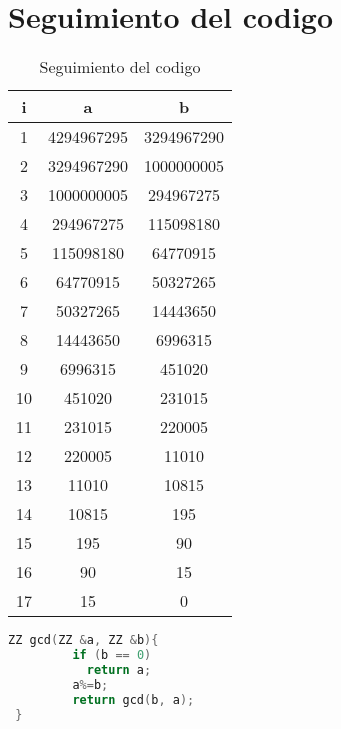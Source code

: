 \section{Seguimiento del codigo}
\begin{table}[!h]
\label{tablax}
\begin{center}
\begin{tabular}{|c|c|c|}
\hline 
i&a&b \\
\hline
1&4294967295&3294967290\\\hline
2&3294967290&1000000005\\\hline
3&1000000005&294967275\\\hline
4&294967275&115098180\\\hline
5&115098180&64770915\\\hline
6&64770915&50327265\\\hline
7&50327265&14443650\\\hline
8&14443650&6996315\\\hline
9&6996315&451020\\\hline
10&451020&231015\\\hline
11&231015&220005\\\hline
12&220005&11010\\\hline
13&11010&10815\\\hline
14&10815&195\\\hline
15&195&90\\\hline
16&90&15\\\hline
17&15&0\\\hline
\end{tabular}
\end{center}
\caption{Seguimiento del codigo}
\end{table}

\begin{lstlisting}[language=C++]
 ZZ gcd(ZZ &a, ZZ &b){                         
         if (b == 0)                             
           return a;                             
         a%=b;                                   
         return gcd(b, a);                       
 }   
\end{lstlisting}

